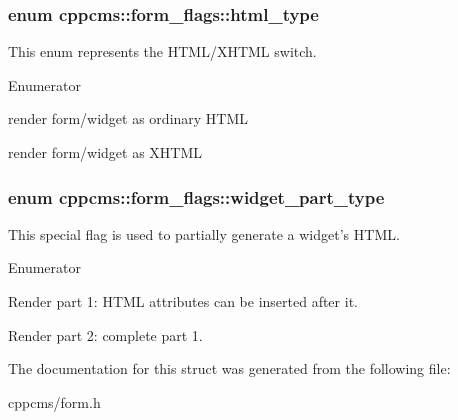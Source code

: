 \subsubsection[{html\-\_\-type}]{\setlength{\rightskip}{0pt plus 5cm}enum {\bf cppcms\-::form\-\_\-flags\-::html\-\_\-type}}\label{structcppcms_1_1form__flags_abb6b0df6fca9aa846a1dc2a638f029dc}
This enum represents the H\-T\-M\-L/\-X\-H\-T\-M\-L switch. \begin{Desc}
\item[Enumerator]\par
\begin{description}
\item[{\em 
as\-\_\-html\label{structcppcms_1_1form__flags_abb6b0df6fca9aa846a1dc2a638f029dca22dae8c4c5dd09a83a3b1fa3b0584099}
}]render form/widget as ordinary H\-T\-M\-L \item[{\em 
as\-\_\-xhtml\label{structcppcms_1_1form__flags_abb6b0df6fca9aa846a1dc2a638f029dca0396633bfa4de75e9de0186b7ba775ff}
}]render form/widget as X\-H\-T\-M\-L \end{description}
\end{Desc}
\subsubsection[{widget\-\_\-part\-\_\-type}]{\setlength{\rightskip}{0pt plus 5cm}enum {\bf cppcms\-::form\-\_\-flags\-::widget\-\_\-part\-\_\-type}}\label{structcppcms_1_1form__flags_ad9bb784f4555eadd91825dc13223c90a}
This special flag is used to partially generate a widget's H\-T\-M\-L. \begin{Desc}
\item[Enumerator]\par
\begin{description}
\item[{\em 
first\-\_\-part\label{structcppcms_1_1form__flags_ad9bb784f4555eadd91825dc13223c90aab1a8d6383cc6a46590fb188bbce43209}
}]Render part 1\-: H\-T\-M\-L attributes can be inserted after it. \item[{\em 
second\-\_\-part\label{structcppcms_1_1form__flags_ad9bb784f4555eadd91825dc13223c90aaf182b9b4f04b7c9ddcb37834a2c74559}
}]Render part 2\-: complete part 1. \end{description}
\end{Desc}


The documentation for this struct was generated from the following file\-:\begin{DoxyCompactItemize}
\item 
cppcms/form.\-h\end{DoxyCompactItemize}
